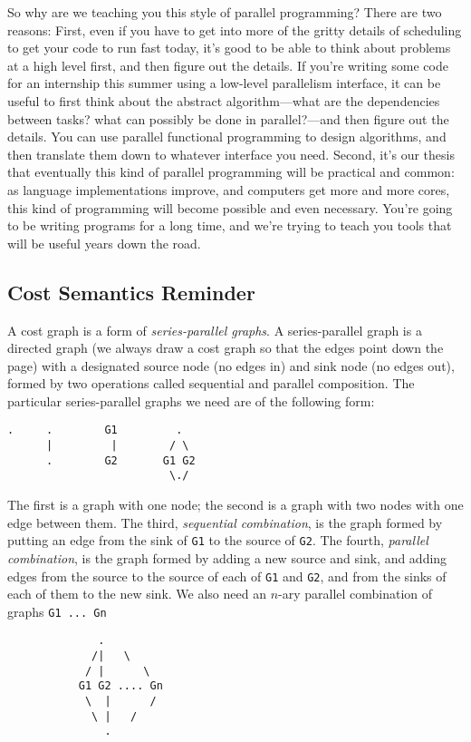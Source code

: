 So why are we teaching you this style of parallel programming?  There
are two reasons: First, even if you have to get into more of the gritty
details of scheduling to get your code to run fast today, it's good to
be able to think about problems at a high level first, and then figure
out the details.  If you're writing some code for an internship this
summer using a low-level parallelism interface, it can be useful to
first think about the abstract algorithm---what are the dependencies
between tasks? what can possibly be done in parallel?---and then figure
out the details.  You can use parallel functional programming to design
algorithms, and then translate them down to whatever interface you need.
Second, it's our thesis that eventually this kind of parallel
programming will be practical and common: as language implementations
improve, and computers get more and more cores, this kind of programming
will become possible and even necessary.  You're going to be writing
programs for a long time, and we're trying to teach you tools that will
be useful years down the road.


\subsection{Cost Semantics Reminder}

A cost graph is a form of \emph{series-parallel graphs}.  A
series-parallel graph is a directed graph (we always draw a cost graph
so that the edges point down the page) with a designated source node (no
edges in) and sink node (no edges out), formed by two operations called
sequential and parallel composition.  The particular series-parallel
graphs we need are of the following form:

\begin{verbatim}
.     .        G1         .
      |         |        / \
      .        G2       G1 G2
                         \./
\end{verbatim}


The first is a graph with one node; the second is a graph with two nodes
with one edge between them.  The third, \emph{sequential combination},
is the graph formed by putting an edge from the sink of \verb|G1| to the
source of \verb|G2|.  The fourth, \emph{parallel combination}, is the
graph formed by adding a new source and sink, and adding edges from the
source to the source of each of \verb|G1| and \verb|G2|, and from the
sinks of each of them to the new sink.  We also need an $n$-ary parallel
combination of graphs \verb|G1 ... Gn|
\begin{verbatim}
              .
             /|   \
            / |      \
           G1 G2 .... Gn
            \  |      /
             \ |   /
               .
\end{verbatim}

